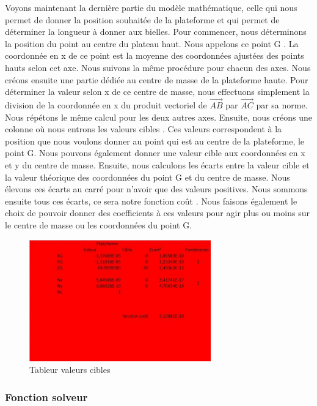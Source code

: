 \documentclass[a4paper,12pt]{article}
\begin{document}
Voyons maintenant la dernière partie du modèle mathématique, celle qui nous permet de donner la position souhaitée de la plateforme et qui permet de déterminer la longueur à donner aux bielles. Pour commencer, nous déterminons la position du point au centre du plateau haut. 
Nous appelons ce point \og G \fg. 
La coordonnée en x de ce point est la moyenne des coordonnées ajustées des points hauts selon cet axe. 
Nous suivons la même procédure pour chacun des axes. 
Nous créons ensuite une partie dédiée au centre de masse de la plateforme haute. 
Pour déterminer la valeur selon x de ce centre de masse, nous effectuons simplement la division de la coordonnée en x du produit vectoriel de $\overrightarrow{AB}$ par $\overrightarrow{AC}$ par sa norme. 
Nous répétons le même calcul pour les deux autres axes. 
Ensuite, nous créons une colonne où nous entrons les valeurs \og cibles \fg. 
Ces valeurs correspondent à la position que nous voulons donner au point qui est au centre de la plateforme, le point G. 
Nous pouvons également donner une valeur cible aux coordonnées en x et y du centre de masse. Ensuite, nous calculons les écarts entre la valeur cible et la valeur théorique des coordonnées du point G et du centre de masse. 
Nous élevons ces écarts au carré pour n'avoir que des valeurs positives. 
Nous sommons ensuite tous ces écarts, ce sera notre fonction \og coût \fg. 
Nous faisons également le choix de pouvoir donner des coefficients à ces valeurs pour agir plus ou moins sur le centre de masse ou les coordonnées du point G.

\begin{figure}[H]
  \centering
  \includegraphics[width=0.7\textwidth]{tableur valeurs cibles.jpg}
  \caption{Tableur valeurs cibles}
\end{figure}

\subsubsection{Fonction solveur}
\end{document}
